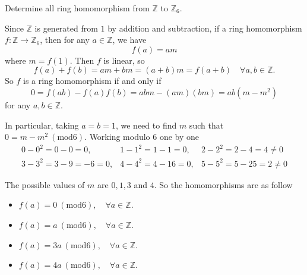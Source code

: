 \begin{example}
    Determine all ring homomorphism from $\mathbb{Z}$ to $\mathbb{Z}_6$.
\end{example}
\begin{solution}
    Since $\mathbb{Z}$ is generated from $1$ by addition and subtraction, if a ring homomorphism $f: \mathbb{Z} \to \mathbb{Z}_6$, then for any 
    $a \in \mathbb{Z}$, we have 
    \[
        f(a) = am
    \]
    where $m = f(1)$. Then $f$ is linear, so 
    \[
        f(a) + f(b) = am + bm = (a+b)m = f(a+b) \quad \forall a, b \in \mathbb{Z}.
    \]
    So $f$ is a ring homomorphism if and only if 
    \[
        0 = f(ab) - f(a)f(b) = abm - (am)(bm) = ab(m - m^2)
    \]
    for any $a,b \in \mathbb{Z}$. 

    In particular, taking $a = b = 1$, we need to find $m$ such that $0 = m - m^2 \> (\text{mod} 6)$. Working modulo 6 one by one 
    \begin{align*}
        0 - 0^2 = 0-0=0, &1-1^2=1-1=0, &2 - 2^2 = 2 - 4 = 4 \neq 0\\
        3 - 3^2 = 3 - 9 = -6 = 0, &4-4^2 = 4 -16 = 0, &5 - 5^2 = 5 - 25 = 2\neq 0
    \end{align*}
    
    The possible values of $m$ are $0, 1, 3$ and $4$. So the homomorphisms are as follow
    \begin{itemize}
        \item $f(a) = 0 \> (\text{mod} 6), \quad \forall a \in \mathbb{Z}$.
        \item $f(a) = a \> (\text{mod} 6), \quad \forall a \in \mathbb{Z}$.
        \item $f(a) = 3a \> (\text{mod} 6), \quad \forall a \in \mathbb{Z}$.
        \item $f(a) = 4a \> (\text{mod} 6), \quad \forall a \in \mathbb{Z}$.
    \end{itemize}
\end{solution}

